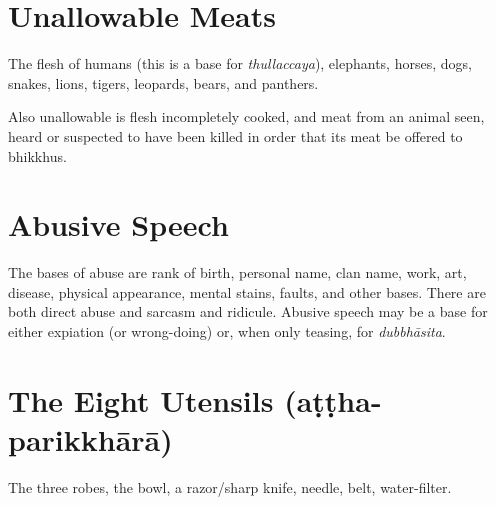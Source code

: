
\section*{Unallowable Meats}

The flesh of humans (this is a base for \emph{thullaccaya}), elephants, horses,
dogs, snakes, lions, tigers, leopards, bears, and panthers.\\
\mbox{}

Also unallowable is flesh incompletely cooked, and meat from an animal seen,
heard or suspected to have been killed in order that its meat be offered to
bhikkhus.\\
\mbox{}

\section*{Abusive Speech}

The bases of abuse are rank of birth, personal name, clan name, work, art,
disease, physical appearance, mental stains, faults, and other bases. There are
both direct abuse and sarcasm and ridicule. Abusive speech may be a base for
either expiation (or wrong-doing) or, when only teasing, for \emph{dubbhāsita}.


\section*{The Eight Utensils (aṭṭha-parikkhārā)}

The three robes, the bowl, a razor/sharp knife, needle, belt, water-filter.\\
\mbox{}